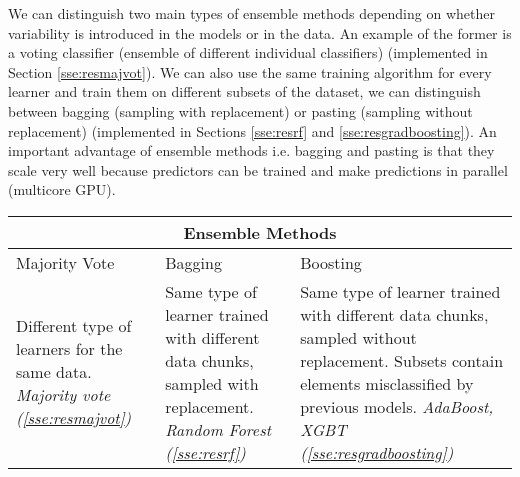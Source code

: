 \documentclass[11pt]{article}
\theoremstyle{definition}
\theoremstyle{remark}
\begin{document}
We can distinguish two main types of ensemble methods depending on whether variability is introduced in the models or in the data. An example of the former is a voting classifier (ensemble of different individual classifiers) (implemented in Section \ref{sse:resmajvot}). We can also use the same training algorithm for every learner and train them on different subsets of the dataset, we can distinguish between bagging (sampling with replacement) or pasting (sampling without replacement) (implemented in Sections \ref{sse:resrf} and \ref{sse:resgradboosting}). 
 An important advantage of ensemble methods i.e. bagging and pasting is that they scale very well because predictors can be trained and make predictions in parallel (multicore GPU).


 \label{tab:ensemblemethods} 
\begin{tabular}{ |p{5cm}|p{5cm}|p{5cm}| } %
 \hline
 \multicolumn{3}{|c|}{Ensemble Methods} \\
 \hline
 Majority Vote & Bagging & Boosting \\ %
 \hline
 Different type of learners for the same data. \emph{Majority vote (\ref{sse:resmajvot})}& Same type of learner trained with different data chunks, sampled with replacement. \emph{Random Forest (\ref{sse:resrf})} & Same type of learner trained with different data chunks, sampled without replacement. Subsets contain elements misclassified by previous models. \emph{AdaBoost, XGBT (\ref{sse:resgradboosting})} \\ 
 \hline

\end{tabular}
\end{document}
